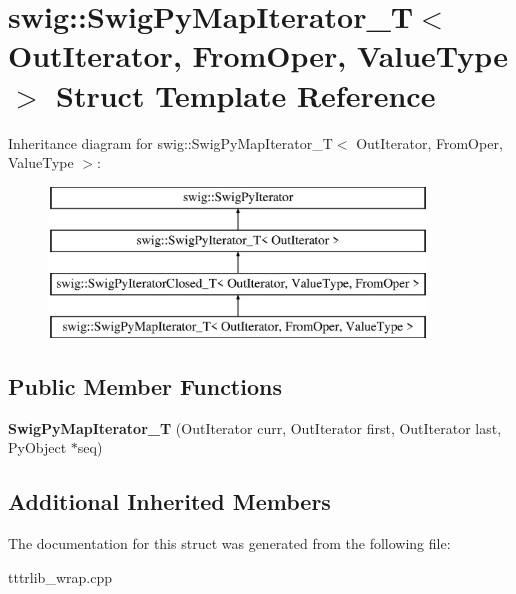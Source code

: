\hypertarget{structswig_1_1_swig_py_map_iterator___t}{}\section{swig\+:\+:Swig\+Py\+Map\+Iterator\+\_\+T$<$ Out\+Iterator, From\+Oper, Value\+Type $>$ Struct Template Reference}
\label{structswig_1_1_swig_py_map_iterator___t}
Inheritance diagram for swig\+:\+:Swig\+Py\+Map\+Iterator\+\_\+T$<$ Out\+Iterator, From\+Oper, Value\+Type $>$\+:\begin{figure}[H]
\begin{center}
\leavevmode
\includegraphics[height=4.000000cm]{structswig_1_1_swig_py_map_iterator___t}
\end{center}
\end{figure}
\subsection*{Public Member Functions}
\begin{DoxyCompactItemize}
\item 
\mbox{\label{structswig_1_1_swig_py_map_iterator___t_af93da33a7a2ad14b70e2ed9f1bcd7ea9}} 
{\bfseries Swig\+Py\+Map\+Iterator\+\_\+T} (Out\+Iterator curr, Out\+Iterator first, Out\+Iterator last, Py\+Object $\ast$seq)
\end{DoxyCompactItemize}
\subsection*{Additional Inherited Members}


The documentation for this struct was generated from the following file\+:\begin{DoxyCompactItemize}
\item 
tttrlib\+\_\+wrap.\+cpp\end{DoxyCompactItemize}
